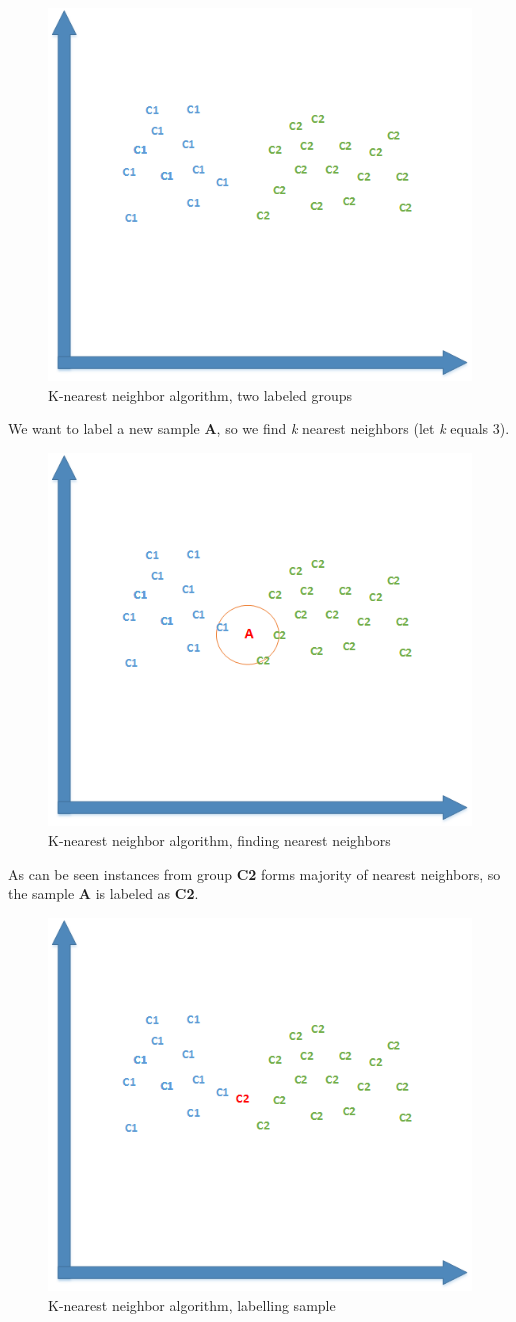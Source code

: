 \begin{itemize}
		\begin{figure}[H]
	\begin{center}
	\includegraphics[width=0.5\linewidth]{images/knn1.png}
	\caption{K-nearest neighbor algorithm, two labeled groups}
	\label{knn1}
	\end{center}
	\end{figure}
	We want to label a new sample \textbf{A}, so we find \textit{k} nearest neighbors (let \textit{k} equals 3).
	\begin{figure}[H]
	\begin{center}
	\includegraphics[width=0.5\linewidth]{images/knn2.png}
	\caption{K-nearest neighbor algorithm, finding nearest neighbors}
	\label{knn2}
	\end{center}
	\end{figure}
	As can be seen instances from group \textbf{C2} forms majority of nearest neighbors, so the sample \textbf{A} is labeled as \textbf{C2}.
	\begin{figure}[H]
	\begin{center}
	\includegraphics[width=0.5\linewidth]{images/knn3.png}
	\caption{K-nearest neighbor algorithm, labelling sample}
	\label{knn3}
	\end{center}
	\end{figure}
		

\end{itemize}
